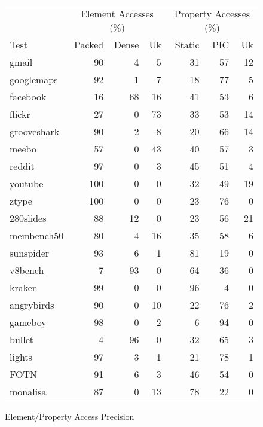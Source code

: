 \begin{figure}
\begin{center}
\begin{tabular}{lrrrrrr}
\toprule
     & \multicolumn{3}{c}{Element Accesses (\%)}
     & \multicolumn{3}{c}{Property Accesses (\%)} \\
\cmidrule(r){2-4}
\cmidrule{5-7}
Test & Packed & Dense & Uk
     & Static & PIC & Uk \\
\midrule
gmail          & 90 & 4 & 5 & 31 & 57 & 12 \\
googlemaps     & 92 & 1 & 7 & 18 & 77 & 5 \\
facebook       & 16 & 68 & 16 & 41 & 53 & 6 \\
flickr         & 27 & 0 & 73 & 33 & 53 & 14 \\
grooveshark    & 90 & 2 & 8 & 20 & 66 & 14 \\
meebo          & 57 & 0 & 43 & 40 & 57 & 3 \\
reddit         & 97 & 0 & 3 & 45 & 51 & 4 \\
youtube        & 100 & 0 & 0 & 32 & 49 & 19 \\
ztype          & 100 & 0 & 0 & 23 & 76 & 0 \\
280slides      & 88 & 12 & 0 & 23 & 56 & 21 \\
membench50     & 80 & 4 & 16 & 35 & 58 & 6 \\
sunspider      & 93 & 6 & 1 & 81 & 19 & 0 \\
v8bench        & 7 & 93 & 0 & 64 & 36 & 0 \\
kraken         & 99 & 0 & 0 & 96 & 4 & 0 \\
angrybirds     & 90 & 0 & 10 & 22 & 76 & 2 \\
gameboy        & 98 & 0 & 2 & 6 & 94 & 0 \\
bullet         & 4 & 96 & 0 & 32 & 65 & 3 \\
lights         & 97 & 3 & 1 & 21 & 78 & 1 \\
FOTN           & 91 & 6 & 3 & 46 & 54 & 0 \\
monalisa       & 87 & 0 & 13 & 78 & 22 & 0 \\
\bottomrule
\end{tabular}
\end{center}
\nocaptionrule \caption{Element/Property Access Precision}
\end{figure}

